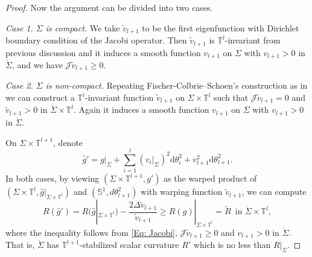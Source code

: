 \documentclass[11pt,letterpaper]{amsart}
\numberwithin{equation}{section}
\theoremstyle{definition}
\begin{document}
\begin{proof}
Now the argument can be divided into two cases.

\medskip

{\it Case 1. $\Sigma$ is compact.} We take $\tilde v_{l+1}$ to be the first eigenfunction with Dirichlet boundary condition of the Jacobi operator. Then $\tilde v_{l+1}$ is $\mathbb T^l$-invariant from previous discussion and it induces a smooth function $v_{l+1}$ on $\Sigma$ with $v_{l+1}>0$ in $\mathring \Sigma$, and we have $\mathcal J\tilde v_{l+1}\geq 0$.

\medskip

{\it Case 2. $\Sigma$ is non-compact.} Repeating Fischer-Colbrie--Schoen's construction
{as in \cite[Proof of Theorem 1]{FcS80}} we can construct a $\mathbb T^l$-invariant function $\tilde v_{l+1}$ on $\Sigma \times \mathbb T^l$ such that $\mathcal J\tilde v_{l+1}=0$ and $\tilde v_{l+1}>0$ in $\mathring \Sigma \times \mathbb T^l$. Again it induces a smooth function $v_{l+1}$ on $\Sigma$ with $v_{l+1}>0$ in $\mathring \Sigma$.

\medskip
On $\Sigma \times \mathbb T^{l+1}$, denote
\begin{equation}\label{Eq: hat g'}
\hat g'=g|_\Sigma+\sum_{i=1}^l(v_i|_{\Sigma})^2\mathrm d\theta_i^2+v_{l+1}^2\mathrm d\theta_{l+1}^2.
\end{equation}
In both cases, by viewing $(\Sigma \times \mathbb T^{l+1}, g')$ as the warped product of $(\Sigma \times \mathbb T^{l}, \hat{g}|_{\Sigma\times \mathbb T^l})$ and $(\mathbb{S}^1, d\theta_{l+1}^2)$ with warping function $\tilde v_{l+1}$, we can compute
$$
R(\hat g')=R(\hat{g}|_{\Sigma\times \mathbb T^l})-\frac{2\Delta \tilde v_{l+1}}{\tilde v_{l+1}}\geq R(\hat g)|_{\Sigma\times \mathbb T^l} = \tilde R
\, \mbox{ in }\mathring \Sigma \times \mathbb T^l,
$$
{where the inequality follows from \eqref{Eq: Jacobi}, $\mathcal{J}\tilde v_{l+1} \ge 0$ and $v_{l+1}>0$ in $\mathring \Sigma$.}
That is, $\mathring\Sigma$ has $\mathbb T^{l+1}$-stabilized scalar curvature $R'$ which is no less than $R|_\Sigma$.
\end{proof}
\end{document}
